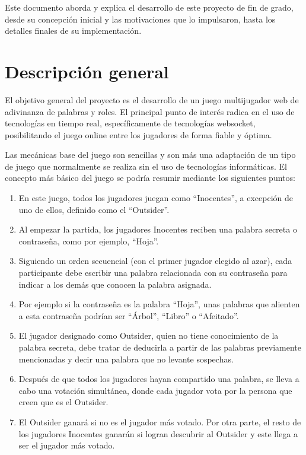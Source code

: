 Este documento aborda y explica el desarrollo de este proyecto de fin de grado,
desde su concepción inicial y las motivaciones que lo impulsaron, hasta los detalles
finales de su implementación.

\section{Descripción general}

El objetivo general del proyecto es el desarrollo de un juego multijugador web de adivinanza de palabras y roles. El principal punto de interés
radica en el uso de tecnologías en tiempo real, específicamente de tecnologías websocket, posibilitando el juego online entre los jugadores
de forma fiable y óptima.

Las mecánicas base del juego son sencillas y son más una adaptación de un tipo de juego que normalmente se realiza sin el uso de tecnologías informáticas.
El concepto más básico del juego se podría resumir mediante los siguientes puntos:

\begin{enumerate}
	\item En este juego, todos los jugadores juegan como ``Inocentes'', a excepción de uno de ellos,
	      definido como el ``Outsider''.
	\item Al empezar la partida, los jugadores
	      Inocentes reciben una
	      palabra secreta o contraseña, como por ejemplo, ``Hoja''.
	\item  Siguiendo un orden secuencial (con el primer jugador elegido al azar), cada
	      participante debe escribir una palabra relacionada con su contraseña
	      para indicar a los demás que conocen la palabra asignada.
	\item Por ejemplo si la contraseña es la palabra ``Hoja'', unas palabras que
	      alienten a esta contraseña podrían ser ``Árbol'', ``Libro'' o ``Afeitado''.
	\item El jugador designado como Outsider, quien no tiene conocimiento de la palabra secreta, debe tratar de deducirla a partir de las palabras
	      previamente mencionadas y decir una palabra que no levante sospechas.
	\item Después de que todos los jugadores hayan compartido una palabra, se lleva a cabo una votación simultánea, donde cada jugador vota por la persona que creen
	      que es el Outsider.
	\item El Outsider ganará si no es el jugador más votado. Por otra parte, el resto de los jugadores Inocentes ganarán
	      si logran descubrir al Outsider y este llega a ser el jugador más votado.
\end{enumerate}

